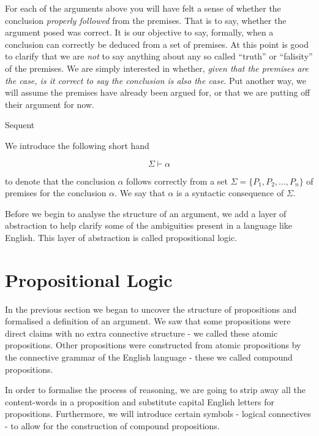 \documentclass{book}
\begin{document}
For each of the arguments above you will have felt a sense of whether the conclusion \emph{properly followed} from the premises. That is to say, whether the argument posed was correct. It is our objective to say, formally, when a conclusion can correctly be deduced from a set of premises. At this point is good to clarify that we are \emph{not} to say anything about any so called ``truth'' or ``falisity'' of the premises. We are simply interested in whether, \emph{given that the premises are the case, is it correct to say the conclusion is also the case}. Put another way, we will assume the premises have already been argued for, or that we are putting off their argument for now. 

\begin{definition}{Sequent}

    We introduce the following short hand

    $$\Sigma \vdash \alpha$$ 

    to denote that the conclusion $\alpha$ follows correctly from a set $\Sigma = \{P_{1},P_{2},...,P_{n}\}$ of premises for the conclusion $\alpha$. We say that $\alpha$ is a syntactic consequence of $\Sigma$. 

\end{definition}

Before we begin to analyse the structure of an argument, we add a layer of abstraction to help clarify some of the ambiguities present in a language like English. This layer of abstraction is called propositional logic. 


\section{Propositional Logic}


In the previous section we began to uncover the structure of propositions and formalised a definition of an argument. We saw that some propositions were direct claims with no extra connective structure - we called these atomic propositions. Other propositions were constructed from atomic propositions by the connective grammar of the English language - these we called compound propositions. 

In order to formalise the process of reasoning, we are going to strip away all the content-words in a proposition and substitute capital English letters for propositions. Furthermore, we will introduce certain symbols - logical connectives - to allow for the construction of compound propositions. 
\end{document}
